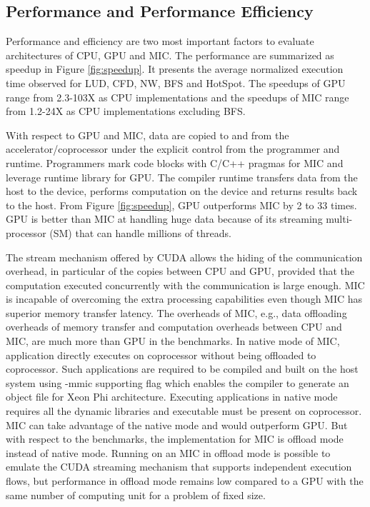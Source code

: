 \subsection{Performance and Performance Efficiency}
Performance and efficiency are two most important factors to evaluate architectures of CPU, GPU and MIC. The performance are summarized as speedup in Figure \ref{fig:speedup}. It presents the average normalized execution time observed for LUD, CFD, NW, BFS and HotSpot. The speedups of GPU range from 2.3-103X as CPU implementations and the speedups of MIC range from 1.2-24X as CPU implementations excluding BFS.
  
With respect to GPU and MIC, data are copied to and from the accelerator/coprocessor under the explicit control from the programmer and runtime. Programmers mark code blocks with C/C++ pragmas for MIC and leverage runtime library for GPU. The compiler runtime transfers data from the host to the device, performs computation on the device and returns results back to the host. From Figure \ref{fig:speedup}, GPU outperforms MIC by 2 to 33 times. GPU is better than MIC at handling huge data because of its streaming multi-processor (SM) that can handle millions of threads.  

The stream mechanism offered by CUDA allows the hiding of the communication overhead, in particular of the copies between CPU and GPU, provided that the computation executed concurrently with the communication is large enough. MIC is incapable of overcoming the extra processing capabilities even though MIC has superior memory transfer latency. The overheads of MIC, e.g., data offloading overheads of memory transfer and computation overheads between CPU and MIC, are much more than GPU in the benchmarks. In native mode of MIC, application directly executes on coprocessor without being offloaded to coprocessor. Such applications are required to be compiled and built on the host system using -mmic supporting flag which enables the compiler to generate an object file for Xeon Phi architecture. Executing applications in native mode requires all the dynamic libraries and executable must be present on coprocessor. MIC can take advantage of the native mode and would outperform GPU. But with respect to the benchmarks, the implementation for MIC is offload mode instead of native mode. Running on an MIC in offload mode is possible to emulate the CUDA streaming mechanism that supports independent execution flows, but performance in offload mode remains low compared to a GPU with the same number of computing unit for a problem of fixed size. 

